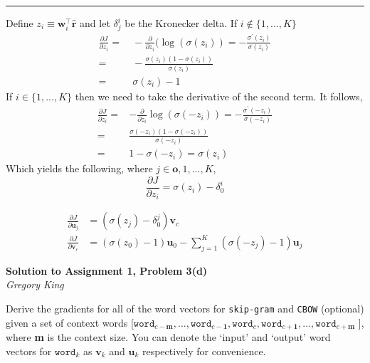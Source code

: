 \documentclass[letter,12pt]{article}
\newcommand{\myhwtitle}[3]
{\begin{center}
{\large {\bf Solution to Assignment {#1}, Problem {#2}}}\\
\medskip
{\it {#3}} %
\end{center}}
\newcommand{\solutionsAuthor}{Gregory King}
\begin{document}
\noindent\rule{\textwidth}{0.4pt}\vspace{5mm}
Define $z_{i} \equiv {\boldsymbol w}^{\top}_{i}\hat{\boldsymbol r}$ and let $\delta^{i}_{j}$ be the Kronecker delta. If $i \notin \{1,...,K\}$
\begin{align}
\frac{\partial J}{\partial{z_{i}}} =& ~-\frac{\partial}{\partial{z_{i}}}(\log(\sigma(z_{i})) = -\frac{\sigma^{\prime}(z_{i})}{\sigma(z_{i})} \\
                                   =& ~-\frac{\sigma(z_{i})(1 - \sigma(z_{i}))}{\sigma(z_{i})} \\
                                   =& ~\sigma(z_{i}) - 1
\end{align}
If $i \in \{1,...,K\}$ then we need to take the derivative of the second term. It follows,
\begin{align}
\frac{\partial J}{\partial{z_{i}}} =& -\frac{\partial}{\partial{z_{i}}}\log(\sigma(-z_{i})) = -\frac{\sigma^{\prime}(-z_{i})}{\sigma(-z_{i})}\\
                                   =&  \frac{\sigma(-z_{i})(1 - \sigma(-z_{i}))}{\sigma(-z_{i})} \\
                                   =& 1 - \sigma(-z_{i}) = \sigma(z_{i})
\end{align}
Which yields the following, where $j\in{{\boldsymbol o},1,...,K}$,
\begin{equation*}
\frac{\partial{J}}{\partial{z_{i}}} = \sigma(z_{i}) - \delta^{i}_{0}
\end{equation*}

\begin{align}
\frac{\partial J}{\partial{\boldsymbol u}_{j}} &= (\sigma(z_{j}) - \delta^{j}_{0}){\boldsymbol v}_{c}\\
\frac{\partial J}{\partial{\boldsymbol v}_{c}} &= (\sigma(z_{0}) - 1){\boldsymbol u}_{0} - \sum^{K}_{j=1}(\sigma(-z_{j}) - 1){\boldsymbol u}_{j}
\end{align}

\clearpage
\myhwtitle{1}{3(d)}{\solutionsAuthor}
\bigskip
\noindent Derive the gradients for all of the word vectors for \texttt{skip-gram} and \texttt{CBOW} (optional)
given a set of context words [$\texttt{word}_{c-\textbf{m}},...,\texttt{word}_{c-\textbf{1}},\texttt{word}_{c},\texttt{word}_{c+\textbf{1}},...,\texttt{word}_{c+\textbf{m}}$ ], where \textbf{m} is the context size. You can denote
the `input' and `output' word vectors for $\texttt{word}_{k}$ as ${\boldsymbol v}_{k}$ and ${\boldsymbol u}_{k}$ respectively for
convenience. \\
\end{document}
